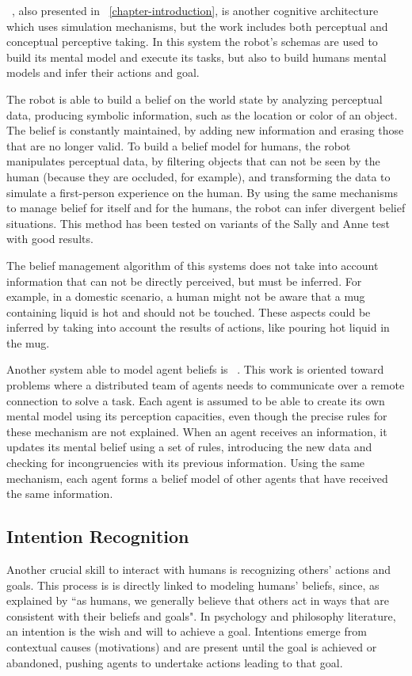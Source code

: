 ~\cite{BreazealGB09}, also presented in ~\ref{chapter-introduction}, is another cognitive architecture which uses simulation mechanisms, but the work  includes both perceptual and conceptual perceptive taking. In this system the robot's schemas are used to build its mental model and execute its tasks, but also to build humans mental models and infer their actions and goal.

The robot is able to build a belief on the world state by analyzing perceptual data, producing symbolic information, such as the location or color of an object. The belief is constantly maintained, by adding new information and erasing those that are no longer valid.
To build a belief model for humans, the robot manipulates perceptual data, by filtering objects that can not be seen by the human (because they are occluded, for example), and transforming the data to simulate a first-person experience on the human. By using the same mechanisms to manage belief for itself and for the humans, the robot can infer divergent belief situations. This method has been tested on variants of the Sally and Anne test with good results.

The belief management algorithm of this systems does not take into account information that can not be directly perceived, but must be inferred. For example, in a domestic scenario, a human might not be aware that a mug containing liquid is hot and should not be touched. These aspects could be inferred by taking into account the results of actions, like pouring hot liquid in the mug.

Another system able to model agent beliefs is ~\cite{scheutz2013computational}. This work is oriented toward problems where a distributed team of agents needs to communicate over a remote connection to solve a task. Each agent is assumed to be able to create its own mental model using its perception capacities, even though the precise rules for these mechanism are not explained. When an agent receives an information, it updates its mental belief using a set of rules, introducing the new data and checking for incongruencies with its previous information.  Using the same mechanism, each agent forms a belief model of other agents that have received the same information.


\subsection{Intention Recognition}
Another crucial skill to interact with humans is recognizing others' actions and goals. This process is is directly linked to modeling humans' beliefs, since, as explained by \cite{byom2013theory} ``as humans, we generally believe that others act in ways that are consistent with their beliefs and goals". In psychology \cite{bruner1981} and philosophy \cite{bratman1984} literature, an intention is the wish and will to achieve a goal. Intentions emerge from contextual causes (motivations) and are present until the goal is achieved or abandoned, pushing agents to undertake actions leading to that goal.

